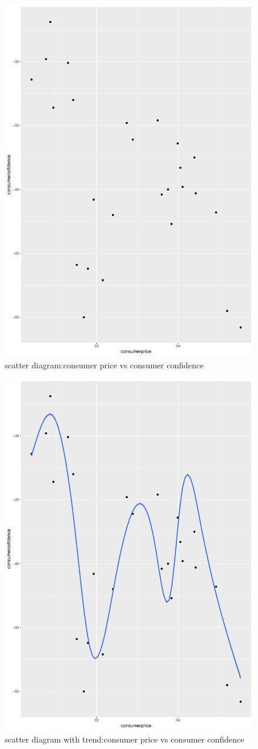 \documentclass[12pt, a4paper, bibliography=totoc, english]{scrartcl}
\begin{document}
\begin{figure}
	\centering
	\includegraphics[width=0.7\linewidth]{Plot9}
	\caption{scatter diagram:consumer price vs consumer confidence}
	\label{fig:plot9}
\end{figure}
\begin{figure}
	\centering
	\includegraphics[width=0.7\linewidth]{Plot10}
	\caption{scatter diagram with trend:consumer price vs consumer confidence}
	\label{fig:plot10}
\end{figure}
\end{document}
